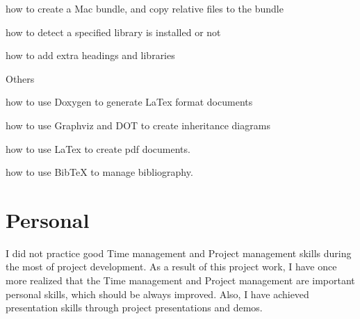 \begin{DoxyItemize}
\begin{DoxyItemize}
\item how to create a Mac bundle, and copy relative files to the bundle
\item how to detect a specified library is installed or not
\item how to add extra headings and libraries
\end{DoxyItemize}
\item Others
\begin{DoxyItemize}
\item how to use Doxygen to generate La\+Tex format documents
\item how to use Graphviz and D\+O\+T to create inheritance diagrams
\item how to use La\+Tex to create pdf documents.
\item how to use Bib\+Te\+X to manage bibliography.
\end{DoxyItemize}
\end{DoxyItemize}\hypertarget{_descriptionof_learning_DescriptionofLearningPersonal}{}\section{Personal}\label{_descriptionof_learning_DescriptionofLearningPersonal}
I did not practice good Time management and Project management skills during the most of project development. As a result of this project work, I have once more realized that the Time management and Project management are important personal skills, which should be always improved. Also, I have achieved presentation skills through project presentations and demos. 